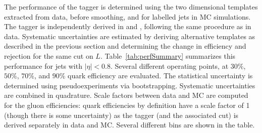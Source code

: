 The performance of the tagger is determined using the two dimensional templates extracted from data, before smoothing, and for labelled jets in MC simulations. The tagger is independently derived in \Pythia and \Herwigpp, following the same procedure as in data. Systematic uncertainties are estimated by deriving alternative templates as described in the previous section and determining the change in efficiency and rejection for the same cut on $L$. Table~\ref{tab:perfSummary} summarizes this performance for jets with $|\eta|<0.8$. Several different operating points, at $30\%$, $50\%$, $70\%$, and $90\%$ quark efficiency are evaluated. The statistical uncertainty is determined using pseudoexperiments via bootstrapping. Systematic uncertainties are combined in quadrature. Scale factors between data and MC are computed for the gluon efficiencies: quark efficiencies by definition have a scale factor of 1 (though there is some uncertainty) as the tagger (and the associated cut) is derived separately in data and MC. Several different \pt bins are shown in the table. 


